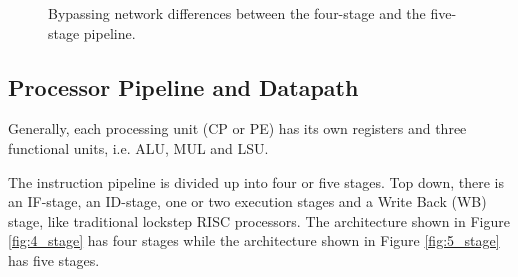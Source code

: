 \begin{figure}[t]
\centering
{}
\hfil
{}
\caption{Bypassing network differences between the four-stage and the five-stage pipeline.}
\label{fig:datapath_pipeline_conf}
\end{figure}

\subsection{Processor Pipeline and Datapath}\label{sec:processor}

Generally, each processing unit (CP or PE) has its own registers and three functional units, i.e. ALU, MUL and LSU. 

The instruction pipeline is divided up into four or five stages. Top down, there is an IF-stage, an ID-stage, one or two execution stages and a Write Back (WB) stage, like traditional lockstep RISC processors. The architecture shown in Figure \ref{fig:4_stage} has four stages while the architecture shown in Figure \ref{fig:5_stage} has five stages.\\

